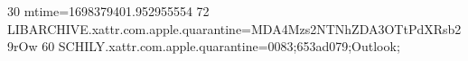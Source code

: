 30 mtime=1698379401.952955554
72 LIBARCHIVE.xattr.com.apple.quarantine=MDA4Mzs2NTNhZDA3OTtPdXRsb29rOw
60 SCHILY.xattr.com.apple.quarantine=0083;653ad079;Outlook;
